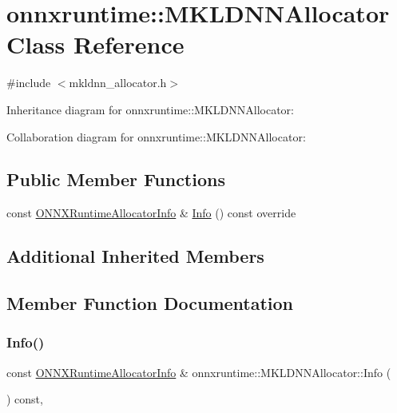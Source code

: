 \hypertarget{classonnxruntime_1_1MKLDNNAllocator}{}\section{onnxruntime\+:\+:M\+K\+L\+D\+N\+N\+Allocator Class Reference}
\label{classonnxruntime_1_1MKLDNNAllocator}


{\ttfamily \#include $<$mkldnn\+\_\+allocator.\+h$>$}



Inheritance diagram for onnxruntime\+:\+:M\+K\+L\+D\+N\+N\+Allocator\+:


Collaboration diagram for onnxruntime\+:\+:M\+K\+L\+D\+N\+N\+Allocator\+:
\subsection*{Public Member Functions}
\begin{DoxyCompactItemize}
\item 
const \mbox{\hyperlink{structONNXRuntimeAllocatorInfo}{O\+N\+N\+X\+Runtime\+Allocator\+Info}} \& \mbox{\hyperlink{classonnxruntime_1_1MKLDNNAllocator_ad8e51ea2f30a5bf719c47b5d96de41c1}{Info}} () const override
\end{DoxyCompactItemize}
\subsection*{Additional Inherited Members}


\subsection{Member Function Documentation}
\mbox{\label{classonnxruntime_1_1MKLDNNAllocator_ad8e51ea2f30a5bf719c47b5d96de41c1}} 
\subsubsection{\texorpdfstring{Info()}{Info()}}
{\footnotesize\ttfamily const \mbox{\hyperlink{structONNXRuntimeAllocatorInfo}{O\+N\+N\+X\+Runtime\+Allocator\+Info}} \& onnxruntime\+::\+M\+K\+L\+D\+N\+N\+Allocator\+::\+Info (\begin{DoxyParamCaption}{ }\end{DoxyParamCaption}) const\hspace{0.3cm}{\ttfamily [override]}, {\ttfamily [virtual]}}



